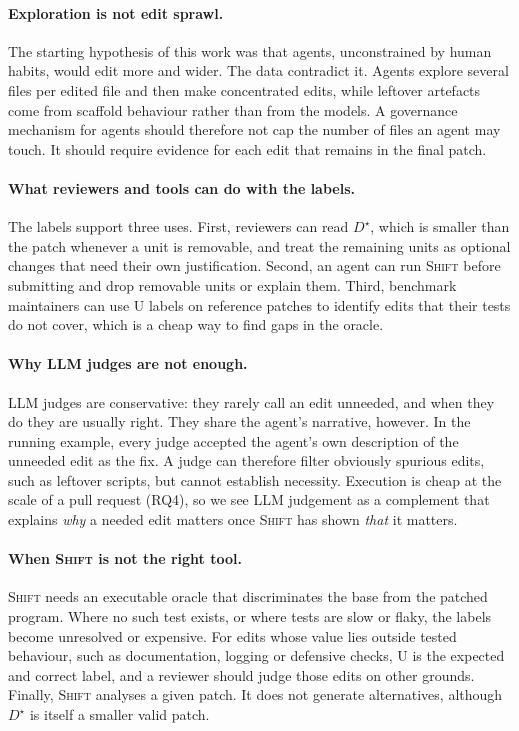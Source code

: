 \documentclass[a4paper,fleqn]{cas-sc}
\newcommand{\tool}{\textsc{Shift}}
\newcommand{\lab}[1]{\textsf{#1}}
\begin{document}
\paragraph{Exploration is not edit sprawl.} The starting hypothesis of this work was that agents, unconstrained by human habits, would edit more and wider. The data contradict it. Agents explore several files per edited file and then make concentrated edits, while leftover artefacts come from scaffold behaviour rather than from the models. A governance mechanism for agents should therefore not cap the number of files an agent may touch. It should require evidence for each edit that remains in the final patch.

\paragraph{What reviewers and tools can do with the labels.} The labels support three uses. First, reviewers can read $D^\star$, which is smaller than the patch whenever a unit is removable, and treat the remaining units as optional changes that need their own justification. Second, an agent can run \tool{} before submitting and drop removable units or explain them. Third, benchmark maintainers can use \lab{U} labels on reference patches to identify edits that their tests do not cover, which is a cheap way to find gaps in the oracle.

\paragraph{Why LLM judges are not enough.} LLM judges are conservative: they rarely call an edit unneeded, and when they do they are usually right. They share the agent's narrative, however. In the running example, every judge accepted the agent's own description of the unneeded edit as the fix. A judge can therefore filter obviously spurious edits, such as leftover scripts, but cannot establish necessity. Execution is cheap at the scale of a pull request (RQ4), so we see LLM judgement as a complement that explains \emph{why} a needed edit matters once \tool{} has shown \emph{that} it matters.

\paragraph{When \tool{} is not the right tool.} \tool{} needs an executable oracle that discriminates the base from the patched program. Where no such test exists, or where tests are slow or flaky, the labels become unresolved or expensive. For edits whose value lies outside tested behaviour, such as documentation, logging or defensive checks, \lab{U} is the expected and correct label, and a reviewer should judge those edits on other grounds. Finally, \tool{} analyses a given patch. It does not generate alternatives, although $D^\star$ is itself a smaller valid patch.
\end{document}
